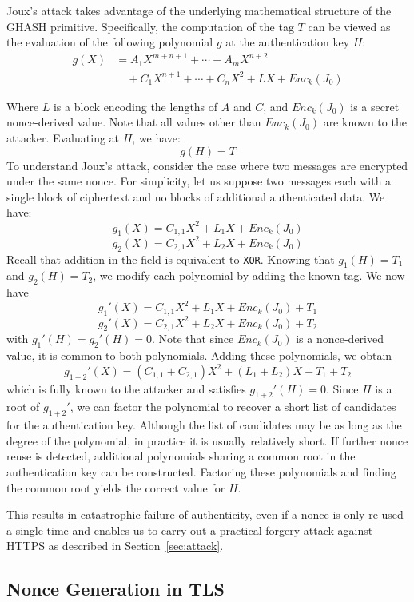 Joux's attack takes advantage of the underlying mathematical structure of the GHASH primitive. Specifically, the computation of the tag $T$ can be viewed as the evaluation of the following polynomial $g$ at the authentication key $H$:
\begin{equation*}
\begin{split}
g(X) &= A_{1}X^{m+n+1} + \cdots + A_{m}X^{n+2} \\
     & \quad + C_{1}X^{n+1} + \cdots + C_{n}X^2 + LX + Enc_k(J_0)
\end{split}
\end{equation*}

Where $L$ is a block encoding the lengths of $A$ and $C$, and $Enc_k(J_0)$ is a secret nonce-derived value. Note that all values other than $Enc_k(J_0)$ are known to the attacker.  Evaluating at $H$, we have:
\[
g(H) = T
\]
To understand Joux's attack, consider the case where two messages are encrypted under the same nonce. For simplicity, let us suppose two messages each with a single block of ciphertext and no blocks of additional authenticated data. We have:
\[
g_{1}(X) = C_{1,1}X^2 + L_{1}X + Enc_k(J_0)
\]
\[
g_{2}(X) = C_{2,1}X^2 + L_{2}X + Enc_k(J_0)
\]
Recall that addition in the field is equivalent to \texttt{XOR}. Knowing that $g_{1}(H) = T_{1}$ and $g_{2}(H) = T_{2}$, we modify each polynomial by adding the known tag. We now have
\[
g_{1}'(X) = C_{1,1}X^2 + L_{1}X + Enc_k(J_0) + T_{1}
\]
\[
g_{2}'(X) = C_{2,1}X^2 + L_{2}X + Enc_k(J_0) + T_{2}
\]
with $g_{1}'(H) = g_{2}'(H) = 0$. Note that since $Enc_k(J_0)$ is a nonce-derived value, it is common to both polynomials. Adding these polynomials, we obtain
\[
g_{1+2}'(X) = (C_{1,1} + C_{2,1})X^2 + (L_{1} + L_{2})X + T_{1} + T_{2}
\]
which is fully known to the attacker and satisfies $g_{1+2}'(H) = 0$. Since $H$ is a root of $g_{1+2}'$, we can factor the polynomial to recover a short list of candidates for the authentication key. Although the list of candidates may be as long as the degree of the polynomial, in practice it is usually relatively short. 
If further nonce reuse is detected, additional polynomials sharing a common root in the authentication key can be constructed. Factoring these polynomials and finding the common root yields the correct value for $H$.

This results in catastrophic failure of authenticity, even if a nonce is only re-used a single time and enables us to carry out a practical forgery attack against HTTPS as described in Section~\ref{sec:attack}.

\subsection{Nonce Generation in TLS}

